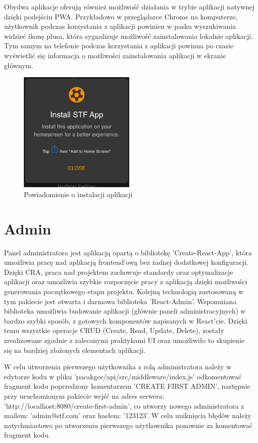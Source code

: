 Obydwa aplikacje oferują również możliwość działania w trybie aplikacji natywnej dzięki podejściu PWA. Przykładowo w przeglądarce Chrome na komputerze, użytkownik podczas korzystania z aplikacji powinien w pasku wyszukiwania widzieć ikonę plusa, która sygnalizuje możliwość zainstalowania lokalnie aplikacji. Tym samym na telefonie podczas korzystania z aplikacji powinna po czasie wyświetlić się informacja o możliwości zainstalowania aplikacji w ekranie głównym.

\begin{figure}[h!]
  \centering
    \includegraphics[width=0.5\textwidth]{images/player/PWA_promt.png}
  \caption{Powiadomienie o instalacji aplikacji}
  \label{fig:mobile}
\end{figure}


\section{Admin}

Panel administratora jest aplikacją opartą o bibliotekę 'Create-React-App', która umożliwia pracę nad aplikacją frontend'ową bez żadnej dodatkowej konfiguracji. Dzięki CRA, praca nad projektem zachowuje standardy oraz optymalizacje aplikacji oraz umożliwia szybkie rozpoczęcie pracy z aplikacją dzięki możliwości generowania początkowego etapu projektu. Kolejną technologią zastosowaną w tym pakiecie jest otwarta i darmowa biblioteka 'React-Admin'. Wspomniana biblioteka umożliwia budowanie aplikacji (głównie paneli administracyjnych) w bardzo szybki sposób, z gotowych komponentów napisanych w React'cie. Dzięki temu wszystkie operacje CRUD (Create, Read, Update, Delete), zostały zrealizowane zgodnie z zalecanymi praktykami UI oraz umożliwiło to skupienie się na bardziej złożonych elementach aplikacji.

W celu utworzenia pierwszego użytkownika z rolą administratora należy w edytorze kodu w pliku 'pacakges/api/src/middleware/index.js' odkomentować fragment kodu poprzedzony komentarzem 'CREATE FIRST ADMIN', następnie przy uruchomionym pakiecie wejść na adres serwera: 'http://localhost:8080/create-first-admin', co utworzy nowego administratora z mailem: 'admin@stf.com' oraz hasłem: '123123'. W celu uniknięcia błędów należy natychmiastowo po utworzeniu pierwszego użytkownika ponownie za komentować fragment kodu.

